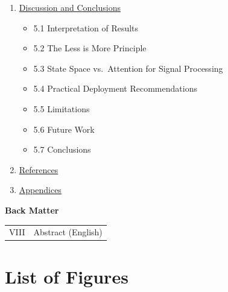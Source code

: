 \documentclass[
  english,
  12pt,
  12pt,
  a4paper,
  oneside]{report}
\newcounter{none} %
\providecommand{\tightlist}{%
  \setlength{\itemsep}{0pt}\setlength{\parskip}{0pt}}
\begin{document}
\begin{enumerate}
  \begin{itemize}
  \tightlist
  \item
    4.1 Channel Model Validation
  \item
    4.2 SISO BPSK Performance (Baseline Relay Comparison)
  \item
    4.3 MIMO 2x2 BPSK Performance
  \item
    4.4 Parameter Normalization \& Complexity Trade-off
  \item
    4.5 Higher-Order Modulation Scalability (Constellation-Aware Training)
  \item
    4.6 Input Normalization and CSI Injection
  \item
    4.7 16-Class 2D Classification for QAM16
  \item
    4.8 End-to-End Joint Optimization
  \end{itemize}
\item
  \hyperref[discussion-and-conclusions]{Discussion and Conclusions}

  \begin{itemize}
  \tightlist
  \item
    5.1 Interpretation of Results
  \item
    5.2 The Less is More Principle
  \item
    5.3 State Space vs.~Attention for Signal Processing
  \item
    5.4 Practical Deployment Recommendations
  \item
    5.5 Limitations
  \item
    5.6 Future Work
  \item
    5.7 Conclusions
  \end{itemize}
\item
  \hyperref[references]{References}
\item
  \hyperref[appendices]{Appendices}
\end{enumerate}

\textbf{Back Matter}

{\def\LTcaptype{none} %
\begin{longtable}[]{@{}ll@{}}
\toprule\noalign{}
\endhead
\bottomrule\noalign{}
\endlastfoot
VIII & Abstract (English) \\
\end{longtable}
}

\chapter*{List of Figures}\label{sec:list-of-figures}
\end{document}
